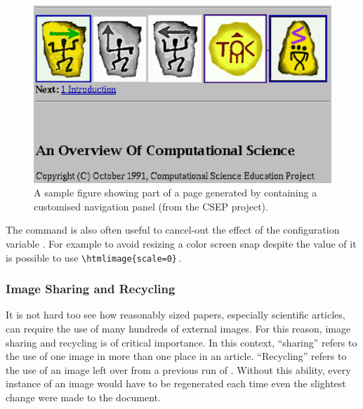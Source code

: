 %
%
%
% 
\begin{figure}[hbt]
    \centering \includegraphics[width=5in]{psfiles/figure}
    \latex{\addtocounter{footnote}{-1}}%
    \caption{A sample figure showing part of a page generated by
       \protect\latextohtml{} containing a customised navigation panel 
       (from the 
        CSEP project).}\label{fig:example}
\end{figure}


%

\noindent
The  command is also often useful to cancel-out the
effect of the configuration variable .
For example to avoid resizing a color screen snap despite 
the value of  it is possible to 
use \verb|\htmlimage{scale=0}|\,.


\subsubsection{Image Sharing and Recycling\label{recycling}}%
%
It is not hard too see how reasonably sized papers,
especially scientific articles, can require
the use of many hundreds of external images.  For this reason,
image sharing and recycling is of critical importance.
In this context, ``sharing'' refers to the use of one
image in more than one place in an article.  ``Recycling''
refers to the use of an image left over from a previous
run of \latextohtml.  Without this ability, every instance of an
image would have to be regenerated each time even the
slightest change were made to the document.

